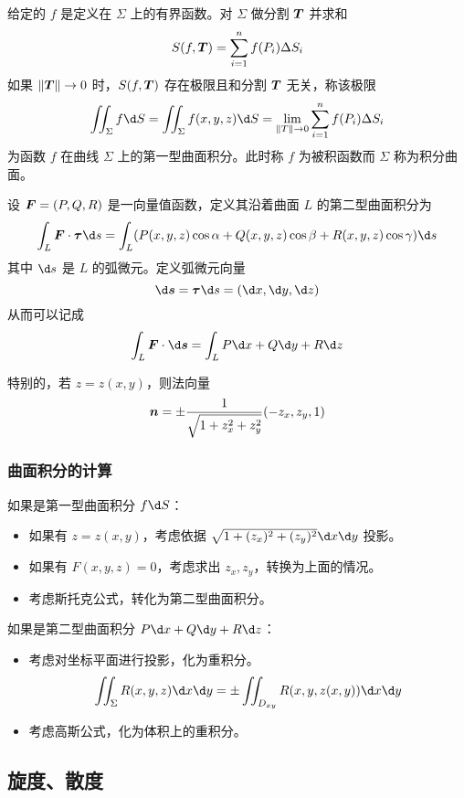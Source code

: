 \begin{definition}[第一型曲面积分]
	给定的 $f$ 是定义在 $\Sigma$ 上的有界函数。对 $\Sigma$ 做分割 $\boldsymbol{T}$ 并求和
	\[ S(f, \boldsymbol{T}) = \sum_{i=1}^{n} f(P_i)\Delta S_i \]
	如果 $\|\boldsymbol{T}\| \to 0$ 时，$S(f, \boldsymbol{T})$ 存在极限且和分割 $\boldsymbol{T}$ 无关，称该极限
	\[ \iint_\Sigma f \d S = \iint_{\Sigma} f(x, y, z) \d S = \lim_{\|T\| \to 0} \sum_{i=1}^{n} f(P_i) \Delta S_i \]
	为函数 $f$ 在曲线 $\Sigma$ 上的第一型曲面积分。此时称 $f$ 为被积函数而 $\Sigma$ 称为积分曲面。
\end{definition}

\begin{definition}[第二型曲面积分]
	设 $\boldsymbol{F} = (P, Q, R)$ 是一向量值函数，定义其沿着曲面 $L$ 的第二型曲面积分为
	\[ \int_L \vbf{F} \cdot \vbf{\tau} \d s = \int_L (P(x,y,z) \cos \alpha + Q(x, y, z) \cos \beta + R(x, y, z) \cos \gamma) \d s \]
	其中 $\d s$ 是 $L$ 的弧微元。定义弧微元向量
	\[ \d \vbf{s} = \vbf{\tau} \d s = (\d x, \d y, \d z) \]
	从而可以记成
	\[ \int_L \vbf{F} \cdot \d \vbf{s} = \int_L P \d x + Q \d y + R \d z \]
\end{definition}


特别的，若 $z = z(x, y)$，则法向量
\[ \boldsymbol{n} = \pm \frac{1}{\sqrt{1 + z_x^2 + z_y^2}} (-z_x, z_y, 1) \]

\subsubsection*{曲面积分的计算}

如果是第一型曲面积分 $f \d S$：
\begin{itemize}
	\item 如果有 $z = z(x, y)$，考虑依据 $\sqrt{1 + (z_x)^2 + (z_y)^2} \d x \d y$ 投影。
	\item 如果有 $F(x, y, z) = 0$，考虑求出 $z_x, z_y$，转换为上面的情况。
	\item 考虑斯托克公式，转化为第二型曲面积分。
\end{itemize}

如果是第二型曲面积分 $P \d x + Q \d y + R \d z$：
\begin{itemize}
	\item 考虑对坐标平面进行投影，化为重积分。
	      \[ \iint_{\Sigma} R(x, y, z) \d x \d y = \pm \iint_{D_{xy}} R(x, y, z(x, y)) \d x \d y \]
	\item 考虑高斯公式，化为体积上的重积分。
\end{itemize}

\subsection{旋度、散度}


